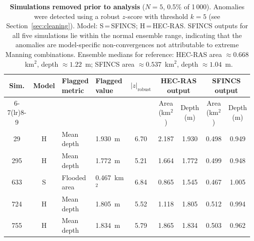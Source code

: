 \documentclass[review,12pt]{elsarticle}
\begin{document}
\begin{landscape}
\begin{table}[htbp]
  \centering
  \caption{\textbf{Simulations removed prior to analysis} ($N = 5$, 0.5\% of 1\,000).
    Anomalies were detected using a robust $z$-score with threshold
    $k = 5$ (see Section~\ref{sec:cleaning}).
    Model: S\,=\,SFINCS; H\,=\,HEC-RAS.
    SFINCS outputs for all five simulations lie within the normal ensemble
    range, indicating that the anomalies are model-specific non-convergences
    not attributable to extreme Manning combinations.
    Ensemble medians for reference: HEC-RAS area $\approx 0.668$~km$^2$,
    depth $\approx 1.22$~m; SFINCS area $\approx 0.537$~km$^2$,
    depth $\approx 1.04$~m.}
  \label{tab:anomalous}
  \small
  \begin{tabular}{cclp{2.4cm}ccccc}
    \toprule
    Sim. & Model & Flagged metric & Flagged value & $|z|_{\mathrm{robust}}$ &
    \multicolumn{2}{c}{HEC-RAS output} & \multicolumn{2}{c}{SFINCS output} \\
    \cmidrule(lr){6-7}\cmidrule(lr){8-9}
    & & & & & Area (km$^2$) & Depth (m) & Area (km$^2$) & Depth (m) \\
    \midrule
    29  & H & Mean depth   & 1.930~m        & 6.70 & 2.187 & 1.930 & 0.498 & 0.949 \\
    295 & H & Mean depth   & 1.772~m        & 5.21 & 1.664 & 1.772 & 0.499 & 0.948 \\
    633 & S & Flooded area & 0.467~km$^{2}$ & 6.84 & 0.865 & 1.545 & 0.467 & 1.005 \\
    724 & H & Mean depth   & 1.805~m        & 5.52 & 1.118 & 1.805 & 0.512 & 0.994 \\
    755 & H & Mean depth   & 1.834~m        & 5.79 & 1.865 & 1.834 & 0.503 & 0.962 \\
    \bottomrule
  \end{tabular}
\end{table}
\end{landscape}
\end{document}
